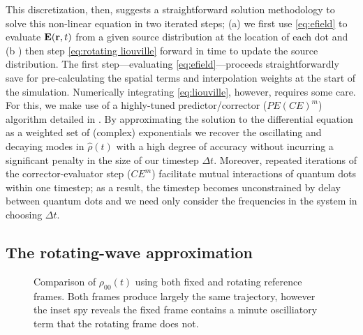 \documentclass[conference]{IEEEtran}
\begin{document}
This discretization, then, suggests a straightforward solution methodology to solve this non-linear equation in two iterated steps; (a) we first use \cref{eq:efield} to evaluate $\vb{E}(\vb{r}, t)$ from a given source distribution at the location of each dot and (b ) then step \cref{eq:rotating liouville} forward in time to update the source distribution.
The first step---evaluating \cref{eq:efield}---proceeds straightforwardly save for pre-calculating the spatial terms and interpolation weights at the start of the simulation.
Numerically integrating \cref{eq:liouville}, however, requires some care.
For this, we make use of a highly-tuned predictor/corrector ($PE(CE)^m$) algorithm detailed in \cite{Glaser2009}.
By approximating the solution to the differential equation as a weighted set of (complex) exponentials we recover the oscillating and decaying modes in $\hat{\rho}(t)$ with a high degree of accuracy without incurring a significant penalty in the size of our timestep $\Delta t$.
Moreover, repeated iterations of the corrector-evaluator step ($CE^m$) facilitate mutual interactions of quantum dots within one timestep; as a result, the timestep becomes unconstrained by delay between quantum dots and we need only consider the frequencies in the system in choosing $\Delta t$.

\subsection{The rotating-wave approximation}
\begin{figure}
  \centering
  
  \caption{\label{fig:frame comparison}
    Comparison of $\rho_{00}(t)$ using both fixed and rotating reference frames.
    Both frames produce largely the same trajectory, however the inset spy reveals the fixed frame contains a minute oscilliatory term that the rotating frame does not.
  }
\end{figure}
\end{document}
